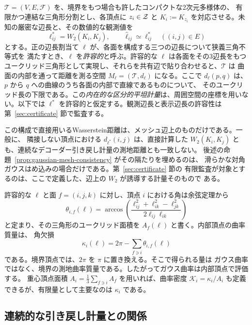 $\mathcal T=(V,E,\mathcal F)$ を、境界をもつ場合も許したコンパクトな2次元多様体の、
有限かつ連結な三角形分割とし、各頂点に $z_i\in\mathcal{Z}$ と
$K_i:=K_{z_i}$ を対応させる。未知の厳密な辺長と、その数値的な観測値を
\begin{equation}
 \ell_{ij}^{*}=W_2(K_i,K_j),
 \qquad \widehat\ell_{ij}\simeq\ell_{ij}^{*}
 \quad ((i,j)\in E)
 \label{eq:true-observed-lengths}
\end{equation}
とする。正の辺長割当て $\ell$ が、各面を構成する三つの辺長について狭義三角不等式を
満たすとき、$\ell$ を\emph{許容的}と呼ぶ。許容的な $\ell$ は各面をその3辺長をもつ
ユークリッド三角形として実現し、それらを共有辺で貼り合わせると、$\mathcal T$ は
曲面の内部を通って距離を測る空間 $M_\ell=(\mathcal T,d_\ell)$ になる。ここで
$d_\ell(p,q)$ は、$p$ から $q$ への曲線のうち各面の内部で直線であるものについて、
そのユークリッド長の下限である。この\emph{内在的な区分的平坦計量}は、周囲空間の座標を用いない。以下では
$\ell^*$ を許容的と仮定する。観測辺長と表示辺長の許容性は
第~\ref{sec:certificate} 節で監査する。

この構成で直接用いるWasserstein距離は、メッシュ辺上のものだけである。一般に、
隣接しない頂点における $d_{\ell^*}(i,j)$ は、直接計算した
$W_2(K_i,K_j)$ とも、連続なデコーダー引き戻し計量の測地距離とも一致しない。
後述の命題~\ref{prop:gaussian-mesh-consistency} がその隔たりを埋めるのは、
滑らかな対角ガウスはめ込みの場合だけである。第~\ref{sec:certificate} 節の
有限監査が対象とするのは、ここで定義した、辺上の $W_2$ が誘導する計量そのもので
ある。

許容的な $\ell$ と面 $f=(i,j,k)$ に対し、頂点 $i$ における角は余弦定理から
\begin{equation}
 \theta_{i,f}(\ell)
 =\arccos\!\left(
 \frac{\ell_{ij}^2+\ell_{ik}^2-\ell_{jk}^2}
 {2\ell_{ij}\ell_{ik}}
 \right)
 \label{eq:finite-angle}
\end{equation}
と定まり、その三角形のユークリッド面積を $A_f(\ell)$ と書く。内部頂点の曲率質量は、
角欠損
\begin{equation}
 \kappa_i(\ell)=2\pi-\sum_{f\ni i}\theta_{i,f}(\ell)
 \label{eq:finite-curvature}
\end{equation}
である。境界頂点では、$2\pi$ を $\pi$ に置き換える。そこで得られる量は
ガウス曲率ではなく、境界の測地曲率質量である。したがってガウス曲率は内部頂点で評価する。
重心頂点面積 $A_i=\frac13\sum_{f\ni i}A_f$ を用いれば、曲率密度
$\mathcal K_i=\kappa_i/A_i$ も定義できるが、有限量として主要なのは $\kappa_i$ である。

\subsection{連続的な引き戻し計量との関係}

